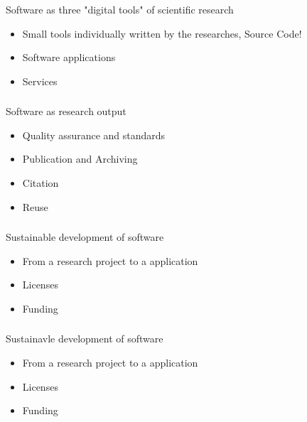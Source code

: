 \documentclass{beamer}
\begin{document}
\begin{frame}
  \frametitle{}
  \begin{block}{}
    \begin{center}
      Software as three "digital tools" of scientific research
      \begin{itemize}
      \item Small tools individually written by the researches, Source Code!
      \item Software applications
      \item Services
      \end{itemize}
    \end{center}
  \end{block}
\end{frame}



\begin{frame}
  \frametitle{}
  \begin{block}{}
    Software as research output
    \begin{center}
      \begin{itemize}
      \item Quality assurance and standards
      \item Publication and Archiving
      \item Citation
      \item Reuse
      \end{itemize}
    \end{center}
  \end{block}
\end{frame}

\begin{frame}
  \frametitle{}
  \begin{block}{}
    Sustainable development of software
    \begin{center}
      \begin{itemize}
      \item From a research project to a application
      \item Licenses
      \item Funding
      \end{itemize}
    \end{center}
  \end{block}
\end{frame}


\begin{frame}
  \frametitle{}
  \begin{block}{}
    Sustainavle development of software
    \begin{center}
      \begin{itemize}
      \item From a research project to a application
      \item Licenses
      \item Funding
      \end{itemize}
    \end{center}
  \end{block}
\end{frame}
\end{document}

